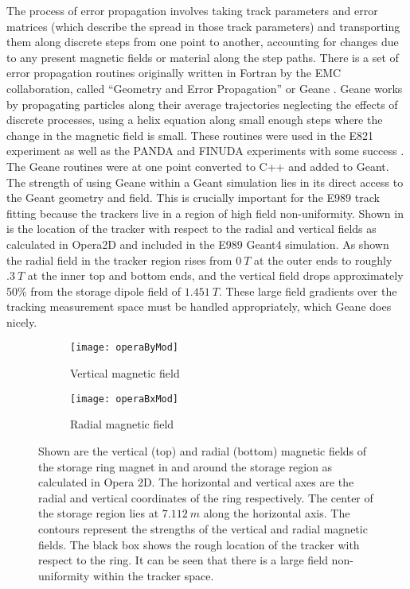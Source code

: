 The process of error propagation involves taking track parameters and error matrices (which describe the spread in those track parameters) and transporting them along discrete steps from one point to another, accounting for changes due to any present magnetic fields or material along the step paths. There is a set of error propagation routines originally written in Fortran by the EMC collaboration, called ``Geometry and Error Propagation'' or Geane \cite{geanemanual}. Geane works by propagating particles along their average trajectories neglecting the effects of discrete processes, using a helix equation along small enough steps where the change in the magnetic field is small. These routines were used in the E821 experiment as well as the PANDA and FINUDA experiments with some success \cite{Lavezzi}. The Geane routines were at one point converted to C++ and added to Geant. The strength of using Geane within a Geant simulation lies in its direct access to the Geant geometry and field. This is crucially important for the E989 track fitting because the trackers live in a region of high field non-uniformity. Shown in  is the location of the tracker with respect to the radial and vertical fields as calculated in Opera2D and included in the E989 Geant4 simulation. As shown the radial field in the tracker region rises from $\SI{0}{T}$ at the outer ends to roughly $\SI{.3}{T}$ at the inner top and bottom ends, and the vertical field drops approximately 50\% from the storage dipole field of $\SI{1.451}{T}$. These large field gradients over the tracking measurement space must be handled appropriately, which Geane does nicely. 


\begin{figure}[]
\centering
    \begin{subfigure}[]{0.75\textwidth}
        \centering
        \texttt{[image: operaByMod]}
        \caption{Vertical magnetic field}
    \label{fig:operaBy}
    \end{subfigure}%
    \vspace{5mm}
    \begin{subfigure}[]{0.75\textwidth}
        \centering
        \texttt{[image: operaBxMod]}
        \caption{Radial magnetic field}
    \label{fig:operaBx}
    \end{subfigure}
\caption[Vertical and radial magnetic fields calculated in Opera2D]{Shown are the vertical (top) and radial (bottom) magnetic fields of the storage ring magnet in and around the storage region as calculated in Opera 2D. The horizontal and vertical axes are the radial and vertical coordinates of the ring respectively. The center of the storage region lies at $\SI{7.112}{m}$ along the horizontal axis. The contours represent the strengths of the vertical and radial magnetic fields. The black box shows the rough location of the tracker with respect to the ring. It can be seen that there is a large field non-uniformity within the tracker space.}
\label{fig:Opera2DFields}
\end{figure}



